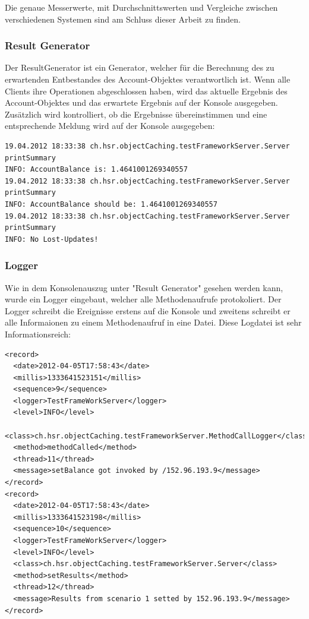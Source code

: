 Die genaue Messerwerte, mit Durchschnittswerten und Vergleiche zwischen verschiedenen Systemen sind am Schluss dieser Arbeit zu finden.

\subsubsection{Result Generator}
\label{sec:resultGenerator}
Der ResultGenerator ist ein Generator, welcher für die Berechnung des zu erwartenden Entbestandes des Account-Objektes verantwortlich ist. Wenn alle Clients ihre Operationen abgeschlossen haben, wird das aktuelle Ergebnis des Account-Objektes und das erwartete Ergebnis auf der Konsole ausgegeben. Zusätzlich wird kontrolliert, ob die Ergebnisse übereinstimmen und eine entsprechende Meldung wird auf der Konsole ausgegeben:
\begin{lstlisting}
19.04.2012 18:33:38 ch.hsr.objectCaching.testFrameworkServer.Server printSummary
INFO: AccountBalance is: 1.4641001269340557
19.04.2012 18:33:38 ch.hsr.objectCaching.testFrameworkServer.Server printSummary
INFO: AccountBalance should be: 1.4641001269340557
19.04.2012 18:33:38 ch.hsr.objectCaching.testFrameworkServer.Server printSummary
INFO: No Lost-Updates!
\end{lstlisting}

\subsubsection{Logger}
\label{sec:logger}
Wie in dem Konsolenauszug unter "Result Generator" gesehen werden kann, wurde ein Logger eingebaut, welcher alle Methodenaufrufe protokoliert. Der Logger schreibt die Ereignisse erstens auf die Konsole und zweitens schreibt er alle Informaionen zu einem Methodenaufruf in eine Datei. Diese Logdatei ist sehr Informationsreich:

\begin{lstlisting}
<record>
  <date>2012-04-05T17:58:43</date>
  <millis>1333641523151</millis>
  <sequence>9</sequence>
  <logger>TestFrameWorkServer</logger>
  <level>INFO</level>
  <class>ch.hsr.objectCaching.testFrameworkServer.MethodCallLogger</class>
  <method>methodCalled</method>
  <thread>11</thread>
  <message>setBalance got invoked by /152.96.193.9</message>
</record>
<record>
  <date>2012-04-05T17:58:43</date>
  <millis>1333641523198</millis>
  <sequence>10</sequence>
  <logger>TestFrameWorkServer</logger>
  <level>INFO</level>
  <class>ch.hsr.objectCaching.testFrameworkServer.Server</class>
  <method>setResults</method>
  <thread>12</thread>
  <message>Results from scenario 1 setted by 152.96.193.9</message>
</record>
\end{lstlisting}

